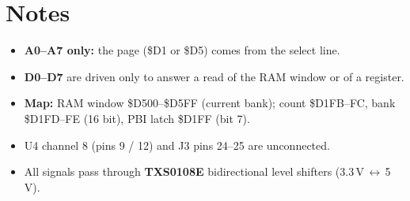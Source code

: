 \documentclass[a4paper,10pt]{article}
\begin{document}
\section{Notes}
\begin{itemize}
    \item \textbf{A0--A7 only:} the page (\$D1 or \$D5) comes from the select line.
    \item \textbf{D0--D7} are driven only to answer a read of the RAM window or of a register.
    \item \textbf{Map:} RAM window \$D500--\$D5FF (current bank); count \$D1FB--FC, bank \$D1FD--FE (16 bit), PBI latch \$D1FF (bit 7).
    \item U4 channel 8 (pins 9 / 12) and J3 pins 24--25 are unconnected.
    \item All signals pass through \textbf{TXS0108E} bidirectional level shifters (3.3\,V\,$\leftrightarrow$\,5\,V).
\end{itemize}
\end{document}
